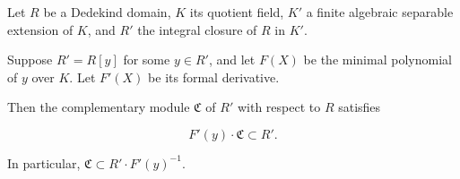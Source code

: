 Let $R$ be a Dedekind domain, $K$ its quotient field, $K'$ a finite algebraic separable extension of $K$, and $R'$ the integral closure of $R$ in $K'$.

Suppose $R' = R[y]$ for some $y \in R'$, and let $F(X)$ be the minimal polynomial of $y$ over $K$. Let $F'(X)$ be its formal derivative.

Then the complementary module $\mathfrak{C}$ of $R'$ with respect to $R$ satisfies

$$F'(y) \cdot \mathfrak{C} \subset R'.$$

In particular, $\mathfrak{C} \subset R' \cdot F'(y)^{-1}$.
